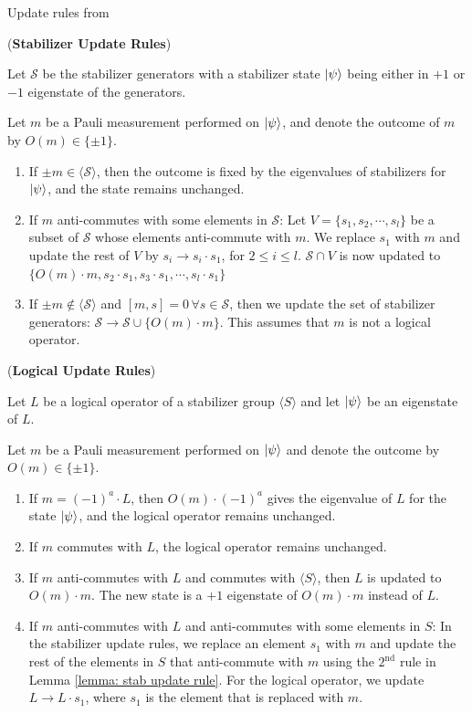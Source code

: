 \documentclass[a4paper,9pt]{ltjsarticle}
\begin{document}
\printbibliography
\clearpage
Update rules from \cite{fu2024}
\begin{lemma}(\textbf{Stabilizer Update Rules})\label{lemma: stab update rule}

    Let $\mathcal{S}$ be the stabilizer generators with a stabilizer state $\ket{\psi}$ being either in $+1$ or $-1$ eigenstate of the generators. 

Let $m$ be a Pauli measurement performed on $\ket{\psi}$, and denote the outcome of $m$ by $O(m)\in \{\pm 1\}$.

\begin{enumerate}
    \item If $\pm m \in \langle \mathcal{S} \rangle$, then the outcome is fixed by the eigenvalues of stabilizers for $\ket{\psi}$, and the state remains unchanged. 
    \item If $m$ anti-commutes with some elements in $\mathcal{S}$: Let $V = \{s_1, s_2,\cdots, s_l\}$ be a subset of $\mathcal{S}$ whose elements anti-commute with $m$. We replace $s_1$ with $m$ and update the rest of $V$ by $s_i \to s_i \cdot s_1$, for $2 \leq i\leq l$. $\mathcal{S} \cap V$ is now updated to $ \{O(m) \cdot m, s_2\cdot s_1, s_3 \cdot s_1,\cdots, s_l\cdot s_1\}$ 
    \item If $\pm m \notin \langle \mathcal{S} \rangle$ and $[m,s]=0 \, \forall s \in \mathcal{S}$, then we update the set of stabilizer generators: $\mathcal{S} \to \mathcal{S} \cup \{O(m) \cdot m\}$. This assumes that $m$ is not a logical operator. 
\end{enumerate}
\end{lemma}

\begin{lemma}(\textbf{Logical Update Rules})\label{lemma: logical update rule}

Let $L$ be a logical operator of a stabilizer group $\langle S\rangle $ and let $\ket{\psi}$ be an eigenstate of $L$.

Let $m$ be a Pauli measurement performed on $\ket{\psi}$ and denote the outcome by $O(m) \in \{\pm 1\}$.
\begin{enumerate}
    \item If $m = (-1)^a \cdot L$, then $O(m)\cdot (-1)^a$ gives the eigenvalue of $L$ for the state $\ket{\psi}$, and the logical operator remains unchanged. 
    \item If $m$ commutes with $L$, the logical operator remains unchanged. 
    \item If $m$ anti-commutes with $L$ and commutes with $\langle S\rangle $, then $L$ is updated to $O(m) \cdot m$. The new state is a $+1$ eigenstate of $O(m) \cdot m$ instead of $L$.
    \item If $m$ anti-commutes with $L$ and anti-commutes with some elements in $S$: In the stabilizer update rules, we replace an element $s_1$ with $m$ and update the rest of the elements in $S$ that anti-commute with $m$ using the $ 2^{\mathrm{nd}} $ rule in Lemma \ref{lemma: stab update rule}. For the logical operator, we update $L\to L\cdot s_1$, where $s_1$ is the element that is replaced with $m$.
\end{enumerate}
\end{lemma}
\end{document}
